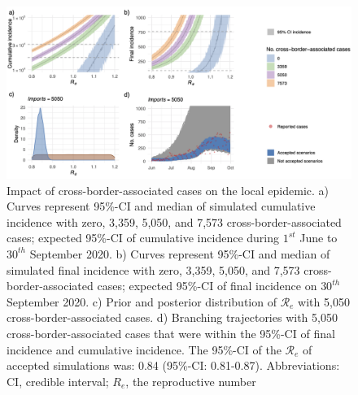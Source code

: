 \documentclass[10pt, a4paper, twoside]{article}
\begin{document}
\begin{multicols}{2}
\begin{figure}
\centering
\includegraphics[scale=0.3]{Figure2_2021-04-30.png}
\caption{Impact of cross-border-associated cases on the local epidemic.
a) Curves represent 95\%-CI and median of simulated cumulative incidence with zero, 3,359, 5,050, and 7,573 cross-border-associated cases; expected 95\%-CI of cumulative incidence during $1^{st}$ June to $30^{th}$ September 2020. 
b) Curves represent 95\%-CI and median of simulated final incidence with zero, 3,359, 5,050, and 7,573 cross-border-associated cases; expected 95\%-CI of final incidence on $30^{th}$ September 2020.
c) Prior and posterior distribution of $\mathcal{R}_e$ with 5,050 cross-border-associated cases.
d) Branching trajectories with 5,050 cross-border-associated cases that were within the 95\%-CI of final incidence and cumulative incidence. 
The 95\%-CI of the $\mathcal{R}_e$ of accepted simulations was: 0.84 (95\%-CI: 0.81-0.87).
Abbreviations: CI, credible interval; $R_e$, the reproductive number}

\label{f2}
\end{figure}


\end{multicols}
\end{document}
